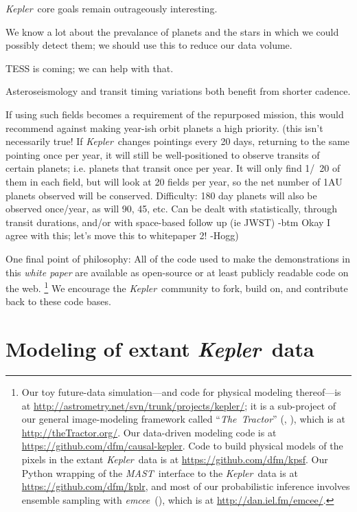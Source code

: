 \documentclass[letterpaper,12pt,preprint]{aastex}
\newcommand{\documentname}{\textsl{white paper}}
\newcommand{\observatory}[1]{\textsl{#1}}
\newcommand{\Kepler}{\observatory{Kepler}}
\newcommand{\project}[1]{\textsl{#1}}
\newcommand{\MAST}{\project{MAST}}
\newcommand{\TheTractor}{\project{The~Tractor}}
\newcommand{\emcee}{\project{emcee}}
\begin{document}
\Kepler\ core goals remain outrageously interesting.

We know a lot about the prevalance of planets and the stars in which
we could possibly detect them; we should use this to reduce our data
volume.

TESS is coming; we can help with that.

Asteroseismology and transit timing variations both benefit from
shorter cadence.

If using such fields becomes a requirement of the repurposed mission,
  this would recommend against making year-ish orbit planets a high priority.
  (this isn't necessarily true! If \Kepler\ changes pointings every 20 days, returning to the same pointing once
  per year, it will still be well-positioned to observe transits of certain planets; i.e. planets that transit
  once per year. It will only find 1/~20 of them in each field, but will look at 20 fields per year, so the
  net number of 1AU planets observed will be conserved. Difficulty: 180 day planets will also be observed once/year,
  as will 90, 45, etc. Can be dealt with statistically, through transit durations, and/or with space-based follow up
  (ie JWST) -btm  Okay I agree with this; let's move this to whitepaper 2! -Hogg)

One final point of philosophy:
All of the code used to make the demonstrations in this \documentname
  are available as open-source or at least publicly readable code on the web.%
\footnote{Our toy future-data simulation---and code for physical modeling thereof---is at
  \url{http://astrometry.net/svn/trunk/projects/kepler/};
  it is a sub-project of our general image-modeling framework
  called ``\TheTractor'' (\citealt{hoggtractor}, \citealt{langtractor}), which is at
  \url{http://theTractor.org/}.
  Our data-driven modeling code is at
  \url{https://github.com/dfm/causal-kepler}.
  Code to build physical models of the pixels in the extant \Kepler\ data is at
  \url{https://github.com/dfm/kpsf}.
  Our Python wrapping of the \MAST\ interface to the \Kepler\ data is at
  \url{https://github.com/dfm/kplr},
  and most of our probabilistic inference involves ensemble sampling
  with \emcee\ (\citealt{emcee}), which is at
  \url{http://dan.iel.fm/emcee/}.}
We encourage the \Kepler\ community to fork, build on, and contribute back to these code bases.

\section{Modeling of extant \Kepler\ data}\label{sec:extant}
\end{document}
